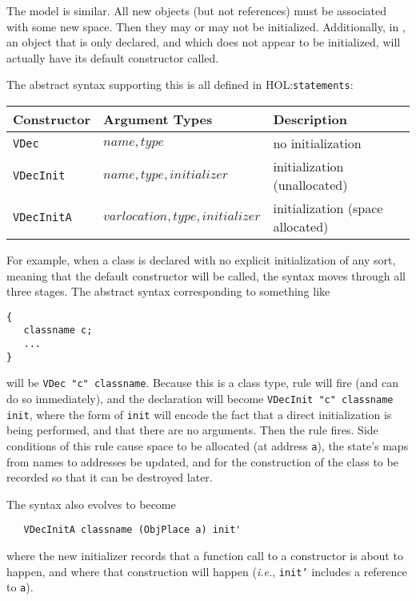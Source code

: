 \documentclass[11pt]{article}
\newcommand{\ie}{\emph{i.e.}}
\newcommand{\HOLfile}[1]{HOL:\texttt{#1}}
\begin{document}
The \cpp{} model is similar.  All new objects (but not references)
must be associated with some new space.  Then they may or may not be
initialized.  Additionally, in \cpp{}, an object that is only
declared, and which does not appear to be initialized, will actually
have its default constructor called.

The abstract syntax supporting this is all defined in
\HOLfile{statements}:

\begin{center}
\begin{tabular}{lll}
Constructor & Argument Types & Description\\
\hline
\texttt{VDec} & $\mathit{name},\mathit{type}$ & no initialization\\
\texttt{VDecInit} &
$\mathit{name},\mathit{type},\mathit{initializer}$ &
initialization (unallocated) \\
\texttt{VDecInitA} &
$\mathit{varlocation},\mathit{type},\mathit{initializer}$ &
initialization (space allocated)
\end{tabular}
\end{center}

For example, when a class is declared with no explicit initialization
of any sort, meaning that the default constructor will be called, the
syntax moves through all three stages.  The abstract syntax
corresponding to something like
\begin{verbatim}
{
   classname c;
   ...
}
\end{verbatim}
will be \texttt{VDec "c" classname}.  Because this is a class type,
rule  will fire (and can do so immediately),
and the declaration will become \texttt{VDecInit "c" classname init},
where the form of \texttt{init} will encode the fact that a direct
initialization is being performed, and that there are no arguments.
Then the rule 
fires.  Side conditions of this rule cause space to be allocated (at
address \texttt{a}), the state's maps from names to addresses be
updated, and for the construction of the class to be recorded so that
it can be destroyed later.

The syntax also evolves to become
\begin{verbatim}
   VDecInitA classname (ObjPlace a) init'
\end{verbatim}
where the new initializer records that a function call to a
constructor is about to happen, and where that construction will
happen (\ie, \texttt{init'} includes a reference to \texttt{a}).
\end{document}
